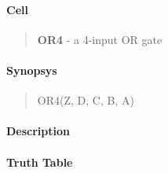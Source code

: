 \label{OR4}
\paragraph{Cell}
\begin{quote}
    \textbf{OR4} - a 4-input OR gate
\end{quote}

\paragraph{Synopsys}
\begin{quote}
    OR4(Z, D, C, B, A)
\end{quote}

\paragraph{Description}

%

\paragraph{Truth Table}


